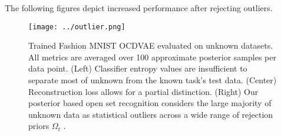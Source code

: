 \documentclass[12pt]{article}
\begin{document}
The following figures depict increased performance after rejecting outliers.

\begin{figure}[h]
  \centering
  \texttt{[image: ../outlier.png]}
  \caption{Trained Fashion MNIST OCDVAE evaluated on unknown datasets. All metrics are averaged over 100 approximate posterior samples per data point. (Left) Classifier entropy values are insufficient to separate most of unknown from the known task’s test data. (Center) Reconstruction loss allows for a partial distinction. (Right) Our posterior based open set recognition considers the large majority of unknown data as statistical outliers across a wide range of rejection priors $\Omega_t$ .
  }
\end{figure}

\newpage


\end{document}
